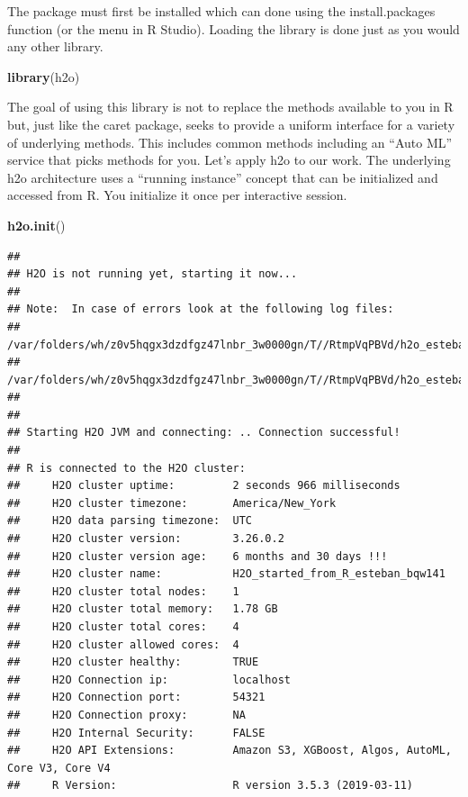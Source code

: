 \documentclass[]{book}
\newenvironment{Shaded}{\begin{snugshade}}{\end{snugshade}}
\newcommand{\KeywordTok}[1]{\textcolor[rgb]{0.13,0.29,0.53}{\textbf{#1}}}
\newcommand{\NormalTok}[1]{#1}
\begin{document}
The package must first be installed which can done using the
install.packages function (or the menu in R Studio). Loading the library
is done just as you would any other library.

\begin{Shaded}
\begin{Highlighting}[]
\KeywordTok{library}\NormalTok{(h2o)}
\end{Highlighting}
\end{Shaded}

The goal of using this library is not to replace the methods available
to you in R but, just like the caret package, seeks to provide a uniform
interface for a variety of underlying methods. This includes common
methods including an ``Auto ML'' service that picks methods for you.
Let's apply h2o to our work. The underlying h2o architecture uses a
``running instance'' concept that can be initialized and accessed from
R. You initialize it once per interactive session.

\begin{Shaded}
\begin{Highlighting}[]
\KeywordTok{h2o.init}\NormalTok{()}
\end{Highlighting}
\end{Shaded}

\begin{verbatim}
## 
## H2O is not running yet, starting it now...
## 
## Note:  In case of errors look at the following log files:
##     /var/folders/wh/z0v5hqgx3dzdfgz47lnbr_3w0000gn/T//RtmpVqPBVd/h2o_esteban_started_from_r.out
##     /var/folders/wh/z0v5hqgx3dzdfgz47lnbr_3w0000gn/T//RtmpVqPBVd/h2o_esteban_started_from_r.err
## 
## 
## Starting H2O JVM and connecting: .. Connection successful!
## 
## R is connected to the H2O cluster: 
##     H2O cluster uptime:         2 seconds 966 milliseconds 
##     H2O cluster timezone:       America/New_York 
##     H2O data parsing timezone:  UTC 
##     H2O cluster version:        3.26.0.2 
##     H2O cluster version age:    6 months and 30 days !!! 
##     H2O cluster name:           H2O_started_from_R_esteban_bqw141 
##     H2O cluster total nodes:    1 
##     H2O cluster total memory:   1.78 GB 
##     H2O cluster total cores:    4 
##     H2O cluster allowed cores:  4 
##     H2O cluster healthy:        TRUE 
##     H2O Connection ip:          localhost 
##     H2O Connection port:        54321 
##     H2O Connection proxy:       NA 
##     H2O Internal Security:      FALSE 
##     H2O API Extensions:         Amazon S3, XGBoost, Algos, AutoML, Core V3, Core V4 
##     R Version:                  R version 3.5.3 (2019-03-11)
\end{verbatim}
\end{document}
